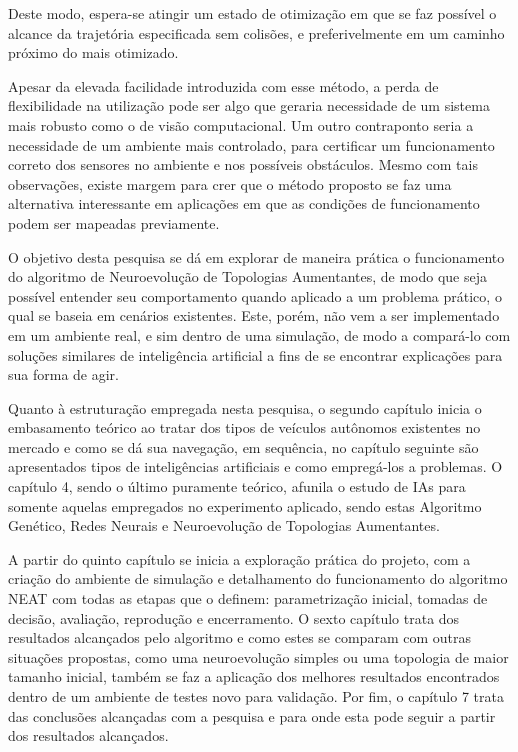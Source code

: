 Deste modo, espera-se atingir um estado de otimização em que se faz
possível o alcance da trajetória especificada sem colisões, e preferivelmente em
um caminho próximo do mais otimizado.

Apesar da elevada facilidade introduzida com esse método, a perda de
flexibilidade na utilização pode ser algo que geraria necessidade de um sistema
mais robusto como o de visão computacional. Um outro contraponto seria a
necessidade de um ambiente mais controlado, para certificar um funcionamento
correto dos sensores no ambiente e nos possíveis obstáculos. Mesmo com tais
observações, existe margem para crer que o método proposto se faz uma
alternativa interessante em aplicações em que as condições de funcionamento
podem ser mapeadas previamente.

O objetivo desta pesquisa se dá em explorar de maneira prática o funcionamento do
algoritmo de Neuroevolução de Topologias Aumentantes, de modo que seja possível 
entender seu comportamento quando aplicado a um problema prático, o qual se baseia
em cenários existentes. Este, porém, não vem a ser implementado em um ambiente real,
e sim dentro de uma simulação, de modo a compará-lo com soluções similares de 
inteligência artificial a fins de se encontrar explicações para sua forma de agir.

Quanto à estruturação empregada nesta pesquisa, o segundo capítulo inicia o embasamento 
teórico ao tratar dos tipos de veículos autônomos existentes no mercado e como se dá sua navegação, 
em sequência, no capítulo seguinte são apresentados tipos de inteligências artificiais e 
como empregá-los a problemas. O capítulo 4, sendo o último puramente teórico, afunila o estudo de 
IAs para somente aquelas empregados no experimento aplicado, sendo estas Algoritmo Genético, Redes Neurais 
e Neuroevolução de Topologias Aumentantes.

A partir do quinto capítulo se inicia a exploração prática do projeto, com a criação do ambiente de 
simulação e detalhamento do funcionamento do 
algoritmo NEAT com todas as etapas que o definem: parametrização inicial, tomadas de decisão, avaliação, reprodução
e encerramento. O sexto capítulo trata dos resultados alcançados pelo algoritmo e como estes se comparam com outras 
situações propostas, como uma neuroevolução simples ou uma topologia de maior tamanho inicial, também se faz a aplicação 
dos melhores resultados encontrados dentro de um ambiente de testes novo para validação.
Por fim, o capítulo 7 trata das conclusões alcançadas com a pesquisa e para onde esta pode seguir a partir dos resultados alcançados.